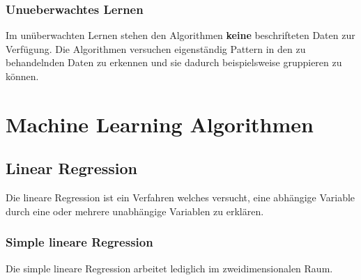 \documentclass{article}
\begin{document}
\subsubsection{Unueberwachtes Lernen}
\begin{flushleft}

Im unüberwachten Lernen stehen den Algorithmen \textbf{keine} beschrifteten Daten zur Verfügung. Die Algorithmen versuchen eigenständig Pattern in den zu behandelnden Daten zu erkennen und sie dadurch beispielsweise gruppieren zu können.
\end{flushleft}


\newpage
\section{Machine Learning Algorithmen}
\subsection{Linear Regression}

Die lineare Regression ist ein Verfahren welches versucht, eine abhängige Variable durch eine oder mehrere unabhängige Variablen zu erklären.

\subsubsection{Simple lineare Regression}

Die simple lineare Regression arbeitet lediglich im zweidimensionalen Raum.

\end{document}
